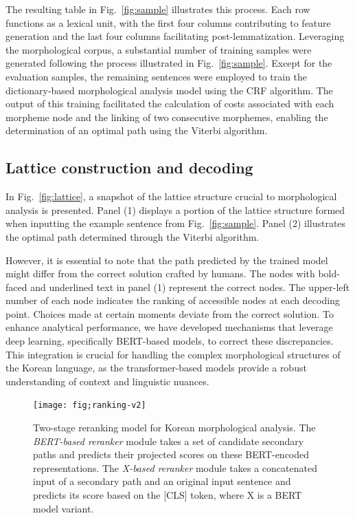 \documentclass[AMS,STIX2COL]{WileyNJD-v2}
\begin{document}
    The resulting table in Fig.~\ref{fig:sample} illustrates this process.
    Each row functions as a lexical unit, with the first four columns contributing to feature generation and the last four columns facilitating post-lemmatization.
    Leveraging the morphological corpus, a substantial number of training samples were generated following the process illustrated in Fig.~\ref{fig:sample}.
    Except for the evaluation samples, the remaining sentences were employed to train the dictionary-based morphological analysis model using the CRF algorithm.
    The output of this training facilitated the calculation of costs associated with each morpheme node and the linking of two consecutive morphemes, enabling the determination of an optimal path using the Viterbi algorithm.

    \subsection{Lattice construction and decoding}\label{subsec:lattice-construction-and-decoding}

    In Fig.~\ref{fig:lattice}, a snapshot of the lattice structure crucial to morphological analysis is presented.
    Panel (1) displays a portion of the lattice structure formed when inputting the example sentence from Fig.~\ref{fig:sample}.
    Panel (2) illustrates the optimal path determined through the Viterbi algorithm.

    However, it is essential to note that the path predicted by the trained model might differ from the correct solution crafted by humans.
    The nodes with bold-faced and underlined text in panel (1) represent the correct nodes.
    The upper-left number of each node indicates the ranking of accessible nodes at each decoding point.
    Choices made at certain moments deviate from the correct solution.
    To enhance analytical performance, we have developed mechanisms that leverage deep learning, specifically BERT-based models, to correct these discrepancies.
    This integration is crucial for handling the complex morphological structures of the Korean language, as the transformer-based models provide a robust understanding of context and linguistic nuances.

    \begin{figure}[ht]
        \centerline{\texttt{[image: fig;ranking-v2]}}
        \caption{Two-stage reranking model for Korean morphological analysis. The \textit{BERT-based reranker} module takes a set of candidate secondary paths and predicts their projected scores on these BERT-encoded representations. The \textit{X-based reranker} module takes a concatenated input of a secondary path and an original input sentence and predicts its score based on the [CLS] token, where X is a BERT model variant.}
        \label{fig:ranking}
    \end{figure}
\end{document}
